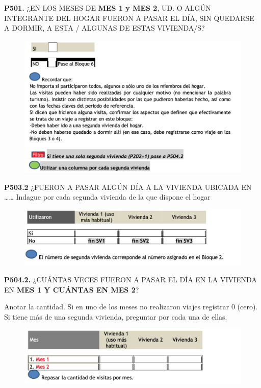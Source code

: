 \documentclass[
  openany]{book}
\begin{document}
\textbf{P501.} ¿EN LOS MESES DE \textbf{MES 1 y MES 2}, UD. O ALGÚN INTEGRANTE DEL HOGAR FUERON A PASAR EL DÍA, SIN QUEDARSE A DORMIR, A ESTA / ALGUNAS DE ESTAS VIVIENDA/S?

\begin{figure}

{\centering \includegraphics[width=1\linewidth]{imagenes/figura6-191} 

}

\end{figure}

\textbf{P503.2} ¿FUERON A PASAR ALGÚN DÍA A LA VIVIENDA UBICADA EN \ldots\ldots{}
Indague por cada segunda vivienda de la que dispone el hogar

\begin{figure}

{\centering \includegraphics[width=1\linewidth]{imagenes/figura6-192} 

}

\end{figure}

\textbf{P504.2.} ¿CUÁNTAS VECES FUERON A PASAR EL DÍA EN LA VIVIENDA EN \textbf{MES 1 Y CUÁNTAS EN MES 2}?

Anotar la cantidad. Si en uno de los meses no realizaron viajes registrar 0 (cero). Si tiene más de una segunda vivienda, preguntar por cada una de ellas.

\begin{figure}

{\centering \includegraphics[width=1\linewidth]{imagenes/figura6-193} 

}

\end{figure}
\end{document}
